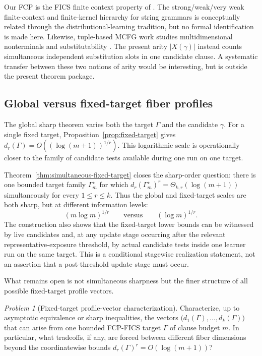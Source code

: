 \documentclass[11pt]{article}
\theoremstyle{definition}
\theoremstyle{remark}
\newtheorem{problem}[theorem]{Problem}
\begin{document}
Our FCP is the FICS finite context property of \cite{ShoudaiEtAl2026}.  The
strong/weak/very weak finite-context and finite-kernel hierarchy for string
grammars \cite{KanazawaYoshinaka2017} is conceptually related through the
distributional-learning tradition, but no formal identification is made here.
Likewise, tuple-based MCFG work studies multidimensional nonterminals and
substitutability \cite{Yoshinaka2011,ClarkYoshinaka2014}.  The present arity
\(|X(\gamma)|\) instead counts simultaneous independent substitution slots in
one candidate clause.  A systematic transfer between these two notions of
arity would be interesting, but is outside the present theorem package.

\subsection{Global versus fixed-target fiber profiles}

The global sharp theorem varies both the target \(\Gamma\) and the candidate
\(\gamma\).  For a single fixed target, Proposition~\ref{prop:fixed-target}
gives
\(d_r(\Gamma) = O((\log(m+1))^{1/r}).\)
This logarithmic scale is operationally closer to the family of candidate
tests available during one run on one target.

Theorem~\ref{thm:simultaneous-fixed-target} closes the sharp-order question:
there is one bounded target family \(\Gamma_m^\star\) for which
\(d_r(\Gamma_m^\star)^r = \Theta_{k,r}(\log(m+1))\)
simultaneously for every \(1\le r\le k\).  Thus the global and fixed-target
scales are both sharp, but at different information levels:
\[
(m\log m)^{1/r}
\qquad\text{versus}\qquad
(\log m)^{1/r}.
\]
The construction also shows that the fixed-target lower bounds can be
witnessed by live candidates and, at any update stage occurring after the
relevant representative-exposure threshold, by actual candidate tests inside
one learner run on the same target.  This is a conditional stagewise
realization statement, not an assertion that a post-threshold update stage
must occur.

What remains open is not simultaneous sharpness but the finer structure of
all possible fixed-target profile vectors.

\begin{problem}[Fixed-target profile-vector characterization]
Characterize, up to asymptotic equivalence or sharp inequalities, the vectors
\(\bigl(d_1(\Gamma),\ldots,d_k(\Gamma)\bigr)\)
that can arise from one bounded FCP-FICS target \(\Gamma\) of clause budget
\(m\).  In particular, what tradeoffs, if any, are forced between different
fiber dimensions beyond the coordinatewise bounds
\(d_r(\Gamma)^r=O(\log(m+1))?\)
\end{problem}
\end{document}
